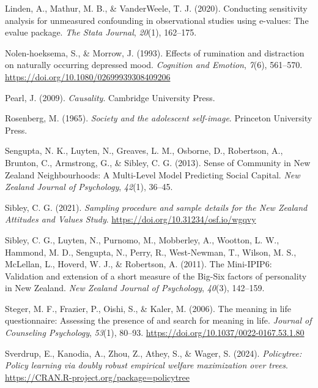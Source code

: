 \documentclass[
  single column]{article}
\newlength{\cslhangindent}
\newenvironment{CSLReferences}[2] %
 {\begin{list}{}{%
  \setlength{\itemindent}{0pt}
  \setlength{\leftmargin}{0pt}
  \setlength{\parsep}{0pt}
  \ifodd #1
   \setlength{\leftmargin}{\cslhangindent}
   \setlength{\itemindent}{-1\cslhangindent}
  \fi
  \setlength{\itemsep}{#2\baselineskip}}}
 {\end{list}}
\begin{document}
\begin{CSLReferences}{1}{0}
Linden, A., Mathur, M. B., \& VanderWeele, T. J. (2020). Conducting
sensitivity analysis for unmeasured confounding in observational studies
using e-values: The evalue package. \emph{The Stata Journal},
\emph{20}(1), 162--175.

Nolen-hoeksema, S., \& Morrow, J. (1993). Effects of rumination and
distraction on naturally occurring depressed mood. \emph{Cognition and
Emotion}, \emph{7}(6), 561--570.
\url{https://doi.org/10.1080/02699939308409206}

Pearl, J. (2009). \emph{Causality}. Cambridge University Press.

Rosenberg, M. (1965). \emph{Society and the adolescent self-image}.
Princeton University Press.

Sengupta, N. K., Luyten, N., Greaves, L. M., Osborne, D., Robertson, A.,
Brunton, C., Armstrong, G., \& Sibley, C. G. (2013). Sense of Community
in {N}ew {Z}ealand Neighbourhoods: A Multi-Level Model Predicting Social
Capital. \emph{New Zealand Journal of Psychology}, \emph{42}(1), 36--45.

Sibley, C. G. (2021). \emph{Sampling procedure and sample details for
the {N}ew {Z}ealand {A}ttitudes and {V}alues {S}tudy}.
\url{https://doi.org/10.31234/osf.io/wgqvy}

Sibley, C. G., Luyten, N., Purnomo, M., Mobberley, A., Wootton, L. W.,
Hammond, M. D., Sengupta, N., Perry, R., West-Newman, T., Wilson, M. S.,
McLellan, L., Hoverd, W. J., \& Robertson, A. (2011). The Mini-IPIP6:
Validation and extension of a short measure of the Big-Six factors of
personality in {N}ew {Z}ealand. \emph{New Zealand Journal of
Psychology}, \emph{40}(3), 142--159.

Steger, M. F., Frazier, P., Oishi, S., \& Kaler, M. (2006). The meaning
in life questionnaire: Assessing the presence of and search for meaning
in life. \emph{Journal of Counseling Psychology}, \emph{53}(1), 80--93.
\url{https://doi.org/10.1037/0022-0167.53.1.80}

Sverdrup, E., Kanodia, A., Zhou, Z., Athey, S., \& Wager, S. (2024).
\emph{Policytree: Policy learning via doubly robust empirical welfare
maximization over trees}.
\url{https://CRAN.R-project.org/package=policytree}


\end{CSLReferences}
\end{document}
